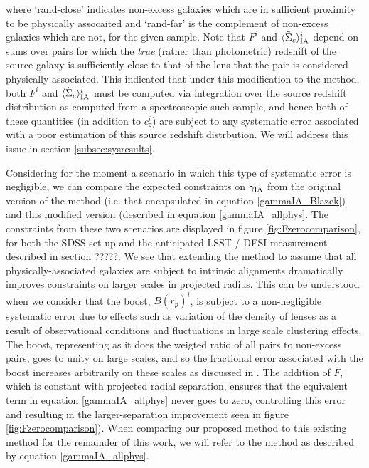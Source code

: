 \documentclass[a4paper,fleqn,usenatbib]{mnras}
\begin{document}
where `rand-close' indicates non-excess galaxies which are in sufficient proximity to be physically assocaited and `rand-far' is the complement of non-excess galaxies which are not, for the given sample. Note that $F^i$ and $\langle \tilde{\Sigma}_c\rangle_{\rm IA}^i$ depend on sums over pairs for which the {\it true} (rather than photometric) redshift of the source galaxy is sufficiently close to that of the lens that the pair is considered physically associated. This indicated that under this modification to the \cite{Blazek2012} method, both $F^i$ and $\langle \tilde{\Sigma}_c\rangle_{\rm IA}^i$ must be computed via integration over the source redshift distribution as computed from a spectroscopic such sample, and hence both of these quantities (in addition to $c_z^i$) are subject to any systematic error associated with a poor estimation of this source redshift distrbution. We will address this issue in section \ref{subsec:sysresults}.

Considering for the moment a scenario in which this type of systematic error is negligible, we can compare the expected constraints on $\bar{\gamma_{\rm IA}}$ from the original version of the method (i.e. that encapsulated in equation \ref{gammaIA_Blazek}) and this modified version (described in equation \ref{gammaIA_allphys}. The constraints from these two scenarios are displayed in figure \ref{fig:Fzerocomparison}, for both the SDSS set-up and the anticipated LSST / DESI measurement described in section ?????. We see that extending the method to assume that all physically-associated galaxies are subject to intrinsic alignments dramatically improves constraints on larger scales in projected radius. This can be understood when we consider that the boost, $B(r_p)^i$, is subject to a non-negligible systematic error due to effects such as variation of the density of lenses as a result of observational conditions and fluctuations in large scale clustering effects. The boost, representing as it does the weigted ratio of all pairs to non-excess pairs, goes to unity on large scales, and so the fractional error associated with the boost increases arbitrarily on these scales as discussed in \cite{Blazek2012}. The addition of $F$, which is constant with projected radial separation, ensures that the equivalent term in equation \ref{gammaIA_allphys} never goes to zero, controlling this error and resulting in the larger-separation improvement seen in figure \ref{fig:Fzerocomparison}). When comparing our proposed method to this existing method for the remainder of this work, we will refer to the method as described by equation \ref{gammaIA_allphys}.
\end{document}
